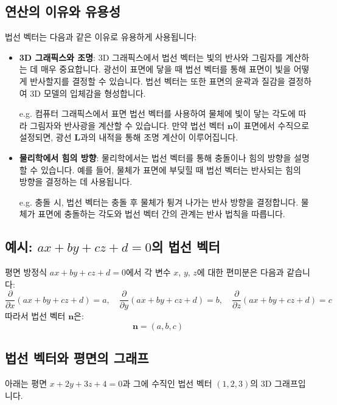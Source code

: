 \subsection{연산의 이유와 유용성}
법선 벡터는 다음과 같은 이유로 유용하게 사용됩니다:
\begin{itemize}
  \item \textbf{3D 그래픽스와 조명}: 3D 그래픽스에서 법선 벡터는 빛의 반사와 그림자를 계산하는 데 매우 중요합니다. 광선이 표면에 닿을 때 법선 벡터를 통해 표면이 빛을 어떻게 반사할지를 결정할 수 있습니다. 법선 벡터는 또한 표면의 윤곽과 질감을 결정하여 3D 모델의 입체감을 형성합니다.

        \vspace{1\baselineskip}
        \noindent {} e.g. 컴퓨터 그래픽스에서 표면 법선 벡터를 사용하여 물체에 빛이 닿는 각도에 따라 그림자와 반사광을 계산할 수 있습니다. 만약 법선 벡터 \( \mathbf{n} \)이 표면에서 수직으로 설정되면, 광선 \( \mathbf{L} \)과의 내적을 통해 조명 계산이 이루어집니다.

  \item \textbf{물리학에서 힘의 방향}: 물리학에서는 법선 벡터를 통해 충돌이나 힘의 방향을 설명할 수 있습니다. 예를 들어, 물체가 표면에 부딪힐 때 법선 벡터는 반사되는 힘의 방향을 결정하는 데 사용됩니다.

        \vspace{1\baselineskip}
        \noindent {} e.g. 충돌 시, 법선 벡터는 충돌 후 물체가 튕겨 나가는 반사 방향을 결정합니다. 물체가 표면에 충돌하는 각도와 법선 벡터 간의 관계는 반사 법칙을 따릅니다.
\end{itemize}

\subsection{예시: \( ax + by + cz + d = 0 \)의 법선 벡터}
평면 방정식 \( ax + by + cz + d = 0 \)에서 각 변수 \( x \), \( y \), \( z \)에 대한 편미분은 다음과 같습니다:
\[
  \frac{\partial}{\partial x} (ax + by + cz + d) = a, \quad \frac{\partial}{\partial y} (ax + by + cz + d) = b, \quad \frac{\partial}{\partial z} (ax + by + cz + d) = c
\]
따라서 법선 벡터 \( \mathbf{n} \)은:
\[
  \mathbf{n} = (a, b, c)
\]

\subsection{법선 벡터와 평면의 그래프}
아래는 평면 \( x + 2y + 3z + 4 = 0 \)과 그에 수직인 법선 벡터 \( (1, 2, 3) \)의 3D 그래프입니다.

